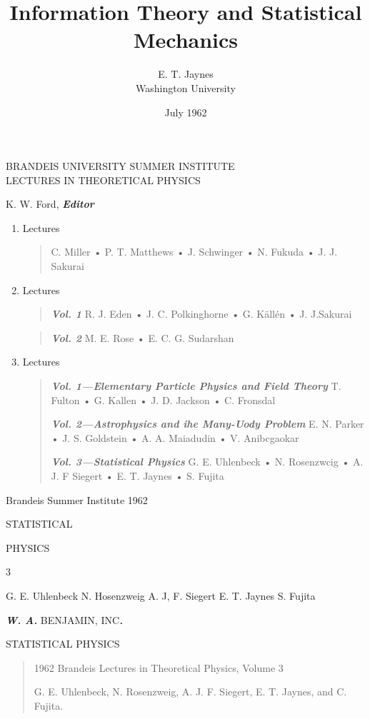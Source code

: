 \documentclass[]{article}
\title{Information Theory and Statistical Mechanics}
\author{E. T. Jaynes\\
Washington University}
\date{July 1962}
\begin{document}
BRANDEIS UNIVERSITY SUMMER INSTITUTE\\
LECTURES IN THEORETICAL PHYSICS

K. W. Ford, \emph{\textbf{Editor}}

\begin{enumerate}
\def\labelenumi{\arabic{enumi}.}
\setcounter{enumi}{1959}
\item
  Lectures

\begin{quote}
C. Miller • P. T. Matthews • J. Schwinger • N. Fukuda • J. J. Sakurai
\end{quote}

\item Lectures
  \begin{quote}
  \emph{\textbf{Vol. 1}}
R. J. Eden • J. C. Polkinghorne • G. Källén • J. J.Sakurai
\end{quote}


\begin{quote}
\emph{\textbf{Vol. 2}}
M. E. Rose • E. C. G. Sudarshan
\end{quote}

\item
  Lectures

\begin{quote}
\emph{\textbf{Vol. 1---Elementary Particle Physics and Field Theory}} T.
Fulton • G. Kallen • J. D. Jackson • C. Fronsdal

\emph{\textbf{Vol. 2---Astrophysics and ihe Many-Uody Problem}} E. N.
Parker • J. S. Goldstein • A. A. Maiadudin • V. Anibcgaokar

\emph{\textbf{Vol. 3---Statistical Physics}} G. E. Uhlenbeck • N.
Rosenzwcig • A. J. F Siegert • E. T. Jaynes • S. Fujita
\end{quote}

\end{enumerate}
\pagebreak

Brandeis Summer Institute 1962

STATISTICAL

PHYSICS

3

G. E. Uhlenbeck N. Hosenzweig A. J, F. Siegert E. T. Jaynes S. Fujita

\emph{\textbf{W. A.}} BENJAMIN, INC\emph{\textbf{.}} 
\pagebreak

\twocolumn

STATISTICAL PHYSICS

\begin{quote}
1962 Brandeis Lectures in Theoretical Physics, Volume 3

G. E. Uhlenbeck, N. Rosenzweig, A. J. F. Siegert, E. T. Jaynes, and C.
Fujita.
\end{quote}
\end{document}
